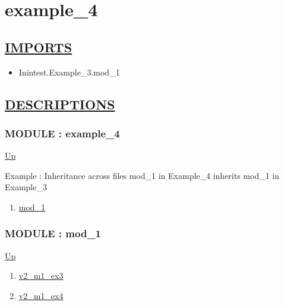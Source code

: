 \chapter*{example\_4}
\hypertarget{ecldoc:toc:example_4}{}

\section*{\underline{IMPORTS}}
\begin{itemize}
\item Inintest.Example\_3.mod\_1
\end{itemize}

\section*{\underline{DESCRIPTIONS}}
\subsection*{MODULE : example\_4}
\hypertarget{ecldoc:example_4}{}
\par
\begin{minipage}[t]{\textwidth}
\begin{flushleft}
  
\end{flushleft}
\end{minipage}
\hyperlink{ecldoc:toc:root}{Up} \\
\par
Example : Inheritance across files mod\_1 in Example\_4 inherits mod\_1 in Example\_3 \\
\par
\begin{enumerate}
\item \hyperlink{ecldoc:example_4.mod_1}{mod\_1}
\end{enumerate}
\subsection*{MODULE : mod\_1}
\hypertarget{ecldoc:example_4.mod_1}{}
\par
\begin{minipage}[t]{\textwidth}
\begin{flushleft}
  
\end{flushleft}
\end{minipage}
\hyperlink{ecldoc:example_4}{Up} \\
\par
\par
\begin{enumerate}
\item \hyperlink{ecldoc:inintest.example_3.mod_1.v2_m1_ex3}{v2\_m1\_ex3}
\item \hyperlink{ecldoc:example_4.mod_1.v2_m1_ex4}{v2\_m1\_ex4}
\end{enumerate}
